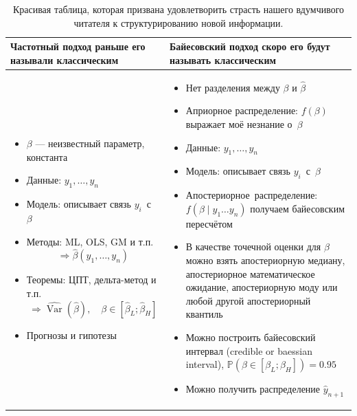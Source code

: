 \documentclass[12pt, a4paper, oneside]{extreport}
\DeclareMathOperator{\Var}{Var}
\def \hb{\hat{\beta}}
\def \hVar{\widehat{\Var}}
\def \b{\beta}
\def \mbb{\mathbb}
\def \PP{\mbb{P}}
\theoremstyle{plain}              %
\theoremstyle{definition}         %
\begin{document}
\begin{table}
\begin{tabularx}{\textwidth}{L|L}
\hline
{\large Частотный подход} \newline раньше его называли классическим  & {\large Байесовский подход} \newline скоро его будут называть классическим  \\
\hline
\begin{itemize}
\item $\beta$ --- неизвестный параметр, константа
\item Данные: $y_1, \ldots, y_n$
\item Модель: описывает связь $y_i$~с~$\beta$
\item Методы: ML, OLS, GM и т.п. \[\Rightarrow \hb(y_1,\ldots,y_n)\]
\item Теоремы: ЦПТ, дельта-метод и т.п.  \[\Rightarrow \hVar(\hb), \quad \b \in [\hb_L; \hb_H]\]
\item Прогнозы и гипотезы
\end{itemize}

&  %

\begin{itemize}
\item Нет разделения между $\beta$ и $\hb$
\item Априорное распределение: $ f( \b )$ выражает моё незнание о~$\b$
\item Данные: $y_1, \ldots, y_n$
\item Модель: описывает связь $y_i$~с~$\beta$
\item Апостериорное~распределение:  $f( \b \mid y_1 \ldots y_n )$ получаем байесовским пересчётом
\item В качестве точечной оценки для $\b$ можно взять апостериорную медиану, апостериорное математическое ожидание, апостериорную моду или любой другой апостериорный квантиль
\item Можно построить байесовский интервал (credible or baessian interval), $\PP( \b \in [\b_L ; \b_H]) = 0.95 $
\item Можно получить распределение $\hat y_{n+1}$
\end{itemize}

\\
\end{tabularx}
\caption{Красивая таблица, которая призвана удовлетворить страсть нашего вдумчивого читателя к структурированию новой информации.} \label{bayes_table}
\end{table}
\end{document}
